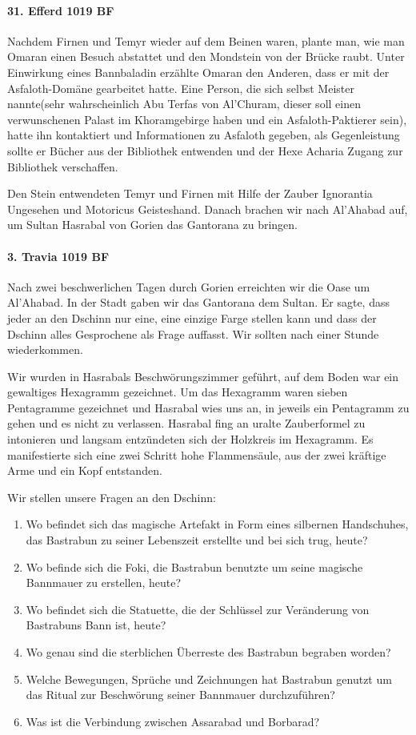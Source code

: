 \paragraph{31. Efferd 1019 BF}
Nachdem Firnen und Temyr wieder auf dem Beinen waren, plante man, wie man Omaran einen Besuch abstattet und den Mondstein von der Brücke raubt. Unter Einwirkung eines Bannbaladin erzählte Omaran den Anderen, dass er mit der Asfaloth-Domäne gearbeitet hatte. Eine Person, die sich selbst Meister nannte(sehr wahrscheinlich Abu Terfas von Al'Churam, dieser soll einen verwunschenen Palast im Khoramgebirge haben und ein Asfaloth-Paktierer sein), hatte ihn kontaktiert und Informationen zu Asfaloth gegeben, als Gegenleistung sollte er Bücher aus der Bibliothek entwenden und der Hexe Acharia Zugang zur Bibliothek verschaffen.

Den Stein entwendeten Temyr und Firnen mit Hilfe der Zauber Ignorantia Ungesehen und Motoricus Geisteshand. Danach brachen wir nach Al'Ahabad auf, um Sultan Hasrabal von Gorien das Gantorana zu bringen.

\paragraph{3. Travia 1019 BF}
Nach zwei beschwerlichen Tagen durch Gorien erreichten wir die Oase um Al'Ahabad. In der Stadt gaben wir das Gantorana dem Sultan. Er sagte, dass jeder an den Dschinn nur eine, eine einzige Farge stellen kann und dass der Dschinn alles Gesprochene als Frage auffasst. Wir sollten nach einer Stunde wiederkommen.

Wir wurden in Hasrabals Beschwörungszimmer geführt, auf dem Boden war ein gewaltiges Hexagramm gezeichnet. Um das Hexagramm waren sieben Pentagramme gezeichnet und Hasrabal wies uns an, in jeweils ein Pentagramm zu gehen und es nicht zu verlassen. Hasrabal fing an uralte Zauberformel zu intonieren und langsam entzündeten sich der Holzkreis im Hexagramm. Es manifestierte sich eine zwei Schritt hohe Flammensäule, aus der zwei kräftige Arme und ein Kopf entstanden.

Wir stellen unsere Fragen an den Dschinn:
\begin{enumerate}
    \item Wo befindet sich das magische Artefakt in Form eines silbernen Handschuhes, das Bastrabun zu seiner Lebenszeit erstellte und bei sich trug, heute?
    \item Wo befinde sich die Foki, die Bastrabun benutzte um seine magische Bannmauer zu erstellen, heute?
    \item Wo befindet sich die Statuette, die der Schlüssel zur Veränderung von Bastrabuns Bann ist, heute?
    \item Wo genau sind die sterblichen Überreste des Bastrabun begraben worden?
    \item Welche Bewegungen, Sprüche und Zeichnungen hat Bastrabun genutzt um das Ritual zur Beschwörung seiner Bannmauer durchzuführen?
    \item Was ist die Verbindung zwischen Assarabad und Borbarad?
\end{enumerate}

